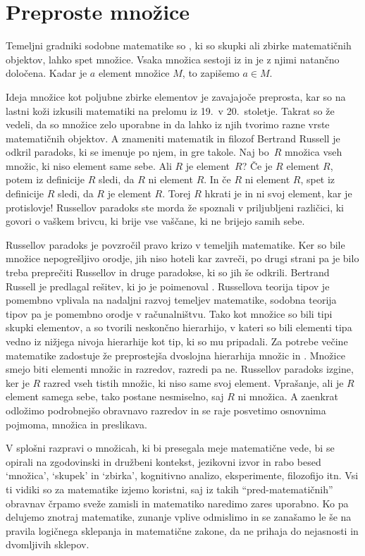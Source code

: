 \chapter{Preproste množice}
\label{cha:preproste-mnozice}


Temeljni gradniki sodobne matematike so , ki so skupki ali zbirke matematičnih
objektov, lahko spet množice. Vsaka množica sestoji iz  in je z njimi
natančno določena. Kadar je $a$ element množice $M$, to zapišemo $a \in M$.

Ideja množice kot poljubne zbirke elementov je zavajajoče preprosta, kar so na lastni koži
izkusili matematiki na prelomu iz 19.~v 20.~stoletje. Takrat so že vedeli, da so množice zelo
uporabne in da lahko iz njih tvorimo razne vrste matematičnih objektov. A znameniti
matematik in filozof Bertrand Russell je odkril paradoks, ki se imenuje po njem, in gre
takole. Naj bo~$R$ množica vseh množic, ki niso element same sebe. Ali $R$ je element~$R$?
Če je $R$ element $R$, potem iz definicije $R$ sledi, da $R$ ni element $R$. In če $R$ ni
element $R$, spet iz definicije $R$ sledi, da $R$ je element $R$. Torej $R$ hkrati je in
ni svoj element, kar je protislovje! Russellov paradoks ste morda že spoznali v
priljubljeni različici, ki govori o vaškem brivcu, ki brije vse vaščane, ki ne brijejo
samih sebe.

Russellov paradoks je povzročil pravo krizo v temeljih matematike. Ker so bile množice
nepogrešljivo orodje, jih niso hoteli kar zavreči, po drugi strani pa je bilo treba
preprečiti Russellov in druge paradokse, ki so jih še odkrili. Bertrand Russell je
predlagal rešitev, ki jo je poimenoval . Russellova teorija tipov je
pomembno vplivala na nadaljni razvoj temeljev matematike, sodobna teorija tipov pa je
pomembno orodje v računalništvu. Tako kot množice so bili tipi skupki elementov, a so
tvorili neskončno hierarhijo, v kateri so bili elementi tipa vedno iz nižjega nivoja
hierarhije kot tip, ki so mu pripadali. Za potrebe večine matematike zadostuje že
preprostejša dvoslojna hierarhija množic in . Množice smejo biti elementi
množic in razredov, razredi pa ne. Russellov paradoks izgine, ker je $R$ razred vseh
tistih množic, ki niso same svoj element. Vprašanje, ali je $R$ element samega sebe, tako
postane nesmiselno, saj $R$ ni množica. A zaenkrat odložimo podrobnejšo obravnavo razredov
in se raje posvetimo osnovnima pojmoma, množica in preslikava.

V splošni razpravi o množicah, ki bi presegala meje matematične vede, bi se opirali na
zgodovinski in družbeni kontekst, jezikovni izvor in rabo besed `množica', `skupek' in
`zbirka', kognitivno analizo, eksperimente, filozofijo itn. Vsi ti vidiki so za matematike
izjemo koristni, saj iz takih ``pred-matematičnih'' obravnav črpamo sveže zamisli in
matematiko naredimo zares uporabno. Ko pa delujemo znotraj matematike, zunanje vplive
odmislimo in se zanašamo le še na pravila logičnega sklepanja in matematične zakone, da ne
prihaja do nejasnosti in dvomljivih sklepov.

